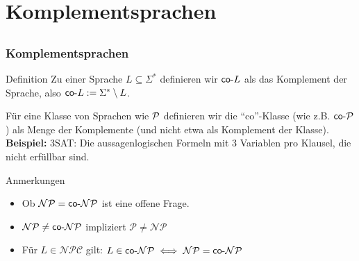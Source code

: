 

%
%

\section{Komplementsprachen}
\subsection{}

\begin{frame}
\frametitle{Komplementsprachen}
\begin{block}{Definition}
Zu einer Sprache $L \subseteq \Sigma^*$ definieren wir $\mathsf{co\text{-}} L$ als das Komplement der Sprache, also
$\mathsf{co\text{-}} L := \Sigma^*\setminus L$.
\end{block}
Für eine Klasse von Sprachen wie $\mathcal{P}$ definieren wir die "`co"'-Klasse (wie z.B. $\mathsf{co\text{-}}\mathcal{P}$) als Menge der Komplemente (und nicht etwa als Komplement der Klasse).\\[8pt]
\pause
\textbf{Beispiel:} \co 3SAT: Die aussagenlogischen Formeln mit 3 Variablen pro Klausel, die nicht erfüllbar sind.\\[8pt]

\begin{block}{Anmerkungen}
\begin{itemize}
\item Ob $\mathcal{NP} = \mathsf{co\text{-}} \mathcal{NP}$ ist eine offene Frage.
\item $\mathcal{NP} \neq \mathsf{co\text{-}} \mathcal{NP}$ impliziert $\mathcal{P} \neq \mathcal{NP}$ 
\item Für $L \in \mathcal{NPC}$ gilt: $L \in \mathsf{co\text{-}} \mathcal{NP} \iff \mathcal{NP} =  \mathsf{co\text{-}} \mathcal{NP}$
\end{itemize}
\end{block}
\end{frame}

